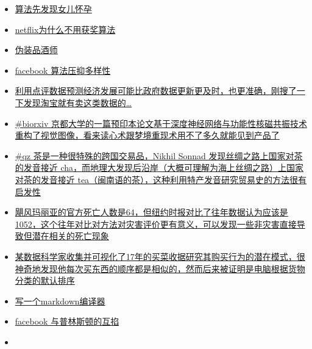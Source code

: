 \documentclass[]{book}
\begin{document}
\begin{itemize}
\item
  \href{https://www.forbes.com/sites/kashmirhill/2012/02/16/how-target-figured-out-a-teen-girl-was-pregnant-before-her-father-did/\#304228956668}{算法先发现女儿怀孕}
\item
  \href{https://www.techdirt.com/articles/20120409/03412518422/why-netflix-never-implemented-algorithm-that-won-netflix-1-million-challenge.shtml}{netflix为什么不用获奖算法}
\item
  \href{http://www.onthelambda.com/2014/02/20/how-to-fake-a-sophisticated-knowledge-of-wine-with-markov-chains/}{伪装品酒师}
\item
  \href{https://medium.com/message/how-facebook-s-algorithm-suppresses-content-diversity-modestly-how-the-newsfeed-rules-the-clicks-b5f8a4bb7bab}{facebook 算法压抑多样性}
\item
  \href{http://voxeu.org/article/measuring-local-economy-yelp-data}{利用点评数据预测经济发展可能比政府数据更新更及时，也更准确，刚搜了一下发现淘宝就有卖这类数据的\ldots{}}
\item
  \href{https://www.biorxiv.org/content/early/2017/12/30/240317}{\#biorxiv 京都大学的一篇预印本论文基于深度神经网络与功能性核磁共振技术重构了视觉图像，看来读心术跟梦境重现术用不了多久就能见到产品了}
\item
  \href{https://qz.com/1176962/map-how-the-word-tea-spread-over-land-and-sea-to-conquer-the-world/}{\#qz 茶是一种很特殊的跨国交易品，Nikhil Sonnad 发现丝绸之路上国家对茶的发音接近 cha，而地理大发现后沿岸（大概可理解为海上丝绸之路）上国家对茶的发音接近 tea（闽南语的茶），这种利用特产发音研究贸易史的方法很有启发性}
\item
  \href{https://www.nytimes.com/interactive/2017/12/08/us/puerto-rico-hurricane-maria-death-toll.html?_r=0}{飓风玛丽亚的官方死亡人数是64，但纽约时报对比了往年数据认为应该是1052，这个往年对比对方法对灾害评价更有意义，可以发现一些非灾害直接导致但潜在相关的死亡现象}
\item
  \href{http://sketches.christianlaesser.com/2018-01-08-shopping-pattern/}{某数据科学家收集并可视化了17年的买菜收据研究其购买行为的潜在模式，很神奇地发现他每次买东西的顺序都是相似的，然而后来被证明是电脑根据货物分类的默认排序}
\item
  \href{https://blog.beezwax.net/2017/07/07/writing-a-markdown-compiler/}{写一个markdown编译器}
\item
  \href{https://www.facebook.com/notes/mike-develin/debunking-princeton/10151947421191849}{facebook 与普林斯顿的互掐}
\item

\end{itemize}
\end{document}
